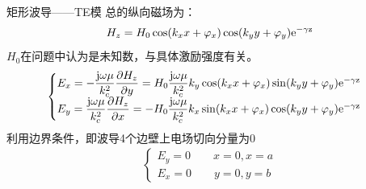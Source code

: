 \begin{frame}{矩形波导——TE模}
    总的纵向磁场为：
    \begin{align}
        H_z=H_0\cos(k_x x+\varphi_x)\cos(k_y y+\varphi_y)\rm{e}^{-\gamma z}
    \end{align}
    $H_0$在问题中认为是未知数，与具体激励强度有关。
    \begin{align*}
        \begin{cases}
            E_x = -\dfrac{\rm{j}\omega\mu}{k_c^2}\dfrac{\partial H_z}{\partial y}=H_0\dfrac{\rm{j}\omega\mu}{k_c^2}k_y\cos(k_x x+\varphi_x)\sin(k_y y+\varphi_y)\rm{e}^{-\gamma z} \\
            E_y = \dfrac{\rm{j}\omega\mu}{k_c^2}\dfrac{\partial H_z}{\partial x}=-H_0\dfrac{\rm{j}\omega\mu}{k_c^2}k_x\sin(k_x x+\varphi_x)\cos(k_y y+\varphi_y)\rm{e}^{-\gamma z}
        \end{cases}
    \end{align*}
    利用边界条件，即波导4个边壁上电场切向分量为0
    \begin{align*}
        \begin{cases}
            E_y = 0 \qquad x=0,x=a \\
            E_x = 0 \qquad y=0,y=b
        \end{cases}
    \end{align*}
\end{frame}

